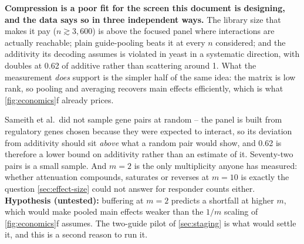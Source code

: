 \begin{keybox}
\textbf{Compression is a poor fit for the screen this document is designing, and
the data says so in three independent ways.} The library size that makes it pay
($n\gtrsim3{,}600$) is above the focused panel where interactions are actually
reachable; plain guide-pooling beats it at every $n$ considered; and the
additivity its decoding assumes is violated in yeast in a systematic direction,
with doubles at 0.62 of additive rather than scattering around 1. What the
measurement \emph{does} support is the simpler half of the same idea: the matrix
is low rank, so pooling and averaging recovers main effects efficiently, which is
what \cref{fig:economics}f already prices.
\end{keybox}

 Sameith et al.\ did not sample
gene pairs at random -- the panel is built from regulatory genes chosen because
they were expected to interact, so its deviation from additivity should sit
\emph{above} what a random pair would show, and 0.62 is therefore a lower bound
on additivity rather than an estimate of it. Seventy-two pairs is a small sample.
And $m=2$ is the only multiplicity anyone has measured: whether attenuation
compounds, saturates or reverses at $m=10$ is exactly the question
\cref{sec:effect-size} could not answer for responder counts either. \textbf{
Hypothesis (untested):} buffering at $m=2$ predicts a shortfall at higher $m$,
which would make pooled main effects weaker than the $1/m$ scaling of
\cref{fig:economics}f assumes. The two-guide pilot of \cref{sec:staging} is what
would settle it, and this is a second reason to run it.

